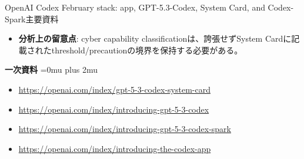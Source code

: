 \begin{technicalnote}{OpenAI Codex February stack: app, GPT-5.3-Codex, System Card, and Codex-Spark}{主要資料}
\begin{minipage}{\linewidth}
\begin{itemize}[leftmargin=1.5em,itemsep=0.35em]
\item \textbf{分析上の留意点}: cyber capability classificationは、誇張せずSystem Cardに記載されたthreshold/precautionの境界を保持する必要がある。
\end{itemize}
\begin{samepage}
{\bfseries 一次資料}
\begingroup\sloppy
\Urlmuskip=0mu plus 2mu\relax
\begin{itemize}[leftmargin=1.5em,itemsep=0.25em]
\item {\scriptsize\url{https://openai.com/index/gpt-5-3-codex-system-card}}
\item {\scriptsize\url{https://openai.com/index/introducing-gpt-5-3-codex}}
\item {\scriptsize\url{https://openai.com/index/introducing-gpt-5-3-codex-spark}}
\item {\scriptsize\url{https://openai.com/index/introducing-the-codex-app}}
\end{itemize}
\endgroup
\end{samepage}
\end{minipage}
\endgroup
\end{technicalnote}
\medskip

